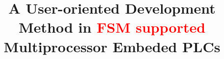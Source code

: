 \documentclass[journal,UTF8]{IEEEtran}
\begin{document}
%
\title{A User-oriented Development Method in \textcolor{red}{FSM supported} Multiprocessor Embeded PLCs}
%
%
%


%
%
\end{document}
